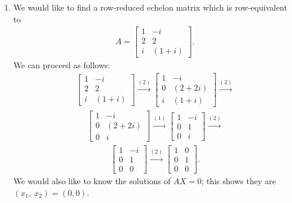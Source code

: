 \documentclass[12pt]{article}
\begin{document}
\begin{enumerate}
  \item
    We would like to find a row-reduced echelon matrix which is
    row-equivalent to
    \begin{align*}
      A =
      \begin{bmatrix}
        1 & -i\\
        2 & 2\\
        i & (1 + i)
      \end{bmatrix}.
    \end{align*}
    We can proceed as follows:
    \begin{align*}
      \begin{bmatrix}
        1 & -i\\
        2 & 2\\
        i & (1 + i)
      \end{bmatrix}
      \xrightarrow{(2)}
      \begin{bmatrix}
        1 & -i\\
        0 & (2 + 2i)\\
        i & (1 + i)
      \end{bmatrix}
      \xrightarrow{(2)}
    \end{align*}
    \begin{align*}
      \begin{bmatrix}
        1 & -i\\
        0 & (2 + 2i)\\
        0 & i
      \end{bmatrix}
      \xrightarrow{(1)}
      \begin{bmatrix}
        1 & -i\\
        0 & 1\\
        0 & i
      \end{bmatrix}
      \xrightarrow{(2)}
    \end{align*}
    \begin{align*}
      \begin{bmatrix}
        1 & -i\\
        0 & 1\\
        0 & 0
      \end{bmatrix}
      \xrightarrow{(2)}
      \begin{bmatrix}
        1 & 0\\
        0 & 1\\
        0 & 0
      \end{bmatrix}.
    \end{align*}
    We would also like to know the solutions of $AX = 0$; this
    shows they are $(x_1,\ x_2) = (0,0)$.


\end{enumerate}
\end{document}

